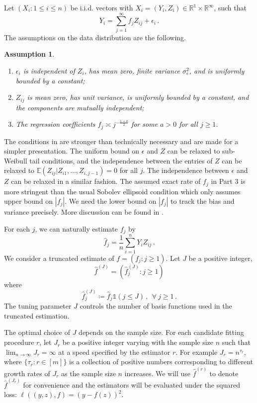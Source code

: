 \documentclass[11pt]{article}
\theoremstyle{plain}
\newtheorem{assumption}[theorem]{Assumption}
\begin{document}
Let $(X_i:1\le i\le n)$ be i.i.d. vectors with $X_i=(Y_i,Z_i)\in\mathbb R^1\times\mathbb R^{\infty}$, such that
\begin{equation}\label{eq:6.3-regression_example}
Y_i=\sum_{j=1}^\infty f_j Z_{ij} +\epsilon_i\,.
\end{equation}
The assumptions on the data distribution are the following.
\begin{assumption}
    \label{asm:6.3-reg-model-cond}
\begin{enumerate}
    \item $\epsilon_i$ is independent of $Z_i$, has mean zero, finite variance $\sigma_\epsilon^2$, and is uniformly bounded by a constant;
    \item  $Z_{ij}$ is mean zero, has unit variance, is uniformly bounded by a constant, and the components are mutually independent;
    \item  The regression coefficients $f_j\asymp j^{-\frac{1+a}{2}}$ for some $a>0$ for all $j\ge 1$.
\end{enumerate}
\end{assumption}
The conditions in  are stronger than technically necessary and are made for a simpler presentation.
The uniform bound on $\epsilon$ and $Z$ can be relaxed to sub-Weibull tail conditions, and the independence between the entries of $Z$ can be relaxed to $\mathbb E(Z_{ij}|Z_{i1},...,Z_{i,j-1})=0$ for all $j$. The independence between $\epsilon$ and $Z$ can be relaxed in a similar fashion.
The assumed exact rate of $f_j$ in Part 3 is more stringent than the usual Sobolev ellipsoid condition which only assumes upper bound on $|f_j|$.  We need the lower bound on $|f_j|$ to track the bias and variance precisely.  More discussion can be found in . 

For each $j$, we can naturally estimate $f_j$ by
$$
\hat f_j=\frac{1}{n}\sum_{i=1}^n Y_i Z_{ij}\,.
$$
We consider a truncated estimate of $f=(f_j:j\ge 1)$. Let $J$ be a positive integer,
$$\hat f^{(J)}=(\hat f_j^{(J)}:j\ge 1)$$
where
\begin{equation}\label{eq:6.3-trunc-est}
\hat f_j^{(J)}\coloneqq \hat f_j \mathds{1}(j\le J)\,,~~\forall~j\ge 1\,.
\end{equation}
The tuning parameter $J$ controls the number of basis functions used in the truncated estimation.

The optimal choice of $J$ depends on the sample size.
For each candidate fitting procedure $r$, let $J_r$ be a positive integer varying with the sample size $n$ such that $\lim_{n\rightarrow\infty}J_{r}=\infty$ at a speed specified by the estimator $r$.  For example $J_{r}=n^{\tau_r}$, where $\{\tau_r: r\in[m]\}$ is a collection of positive numbers corresponding to different growth rates of $J_{r}$ as the sample size $n$ increases. 
We will use $\hat f^{(r)}$ to denote $\hat f^{(J_r)}$ for convenience and the estimators will be evaluated under the squared loss: $\ell((y,z),f)=(y-f(z))^2$.
\end{document}
